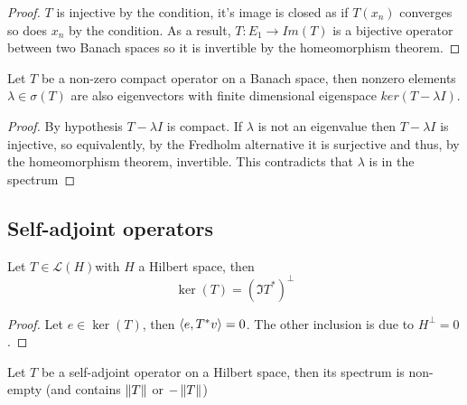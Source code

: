 \documentclass[
    a4paper,
    DIV=14,
    abstract=true,
    numbers=noenddot
]{scrartcl}
\begin{document}
\begin{proof}
	$T$ is injective by the condition, it's image is closed as if $T(x_n)$ converges so does $x_n$ by the condition. As a result, $T:E_1\to Im(T)$ is a bijective operator between two Banach spaces so it is invertible by the homeomorphism theorem.
\end{proof}
\begin{proposition}
	Let $T$ be a non-zero compact operator on a Banach space, then nonzero elements $\lambda\in\sigma(T)$ are also eigenvectors with finite dimensional eigenspace $ker(T-\lambda I)$.
\end{proposition}
\begin{proof}
	By hypothesis $T-\lambda I$ is compact. If $\lambda$ is not an eigenvalue then $T-\lambda I$ is injective, so equivalently, by the Fredholm alternative it is surjective and thus, by the homeomorphism theorem, invertible. This contradicts that $\lambda$ is in the spectrum
\end{proof}
\subsection{Self-adjoint operators}
\begin{proposition}
	Let $T\in\mathcal{L}(H)$with $H$ a Hilbert space, then
	\begin{equation*}
		\ker(T)=(\Im T^*)^\perp
	\end{equation*}
\end{proposition}
\begin{proof}
	Let $e\in \ker(T)$, then $\left\langle e,T^*v\right\rangle=0$. The other inclusion is due to $H^\perp =0$.
\end{proof}
\begin{proposition}
	Let $T$ be a self-adjoint operator on a Hilbert space, then its spectrum is non-empty (and contains $\left\lVert T \right\rVert$ or $-\left\lVert T \right\rVert$)
\end{proposition}
\end{document}
